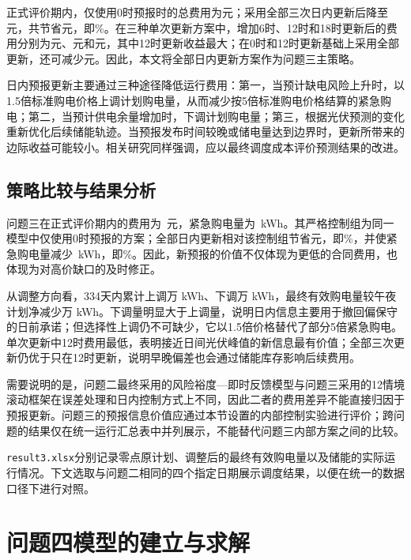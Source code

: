 \documentclass[UTF8,fontset=none,12pt,a4paper]{ctexart}
\newcommand{\sourceinput}[1]{}
\begin{document}
正式评价期内，仅使用0时预报时的总费用为\QThreeIssueZeroCost 元；采用全部三次日内更新后降至\QThreeCost 元，共节省\QThreeUpdateSaving 元，即\QThreeSavingPct\%。在三种单次更新方案中，增加6时、12时和18时更新后的费用分别为\QThreeIssueSixCost 元、\QThreeIssueTwelveCost 元和\QThreeIssueEighteenCost 元，其中12时更新收益最大；在0时和12时更新基础上采用全部更新，还可减少\QThreeAllVsTwelveSaving 元。因此，本文将全部日内更新方案作为问题三主策略。

日内预报更新主要通过三种途径降低运行费用：第一，当预计缺电风险上升时，以1.5倍标准购电价格上调计划购电量，从而减少按5倍标准购电价格结算的紧急购电；第二，当预计供电余量增加时，下调计划购电量；第三，根据光伏预测的变化重新优化后续储能轨迹。当预报发布时间较晚或储电量达到边界时，更新所带来的边际收益可能较小。相关研究同样强调，应以最终调度成本评价预测结果的改进\cite{mazzola}。

\subsection{策略比较与结果分析}
问题三在正式评价期内的费用为\QThreeCost\ 元，紧急购电量为\QThreeEmergencyEnergy\ kWh。其严格控制组为同一模型中仅使用0时预报的方案；全部日内更新相对该控制组节省\QThreeUpdateSaving 元，即\QThreeSavingPct\%，并使紧急购电量减少\QThreeEmergencySaving\ kWh，即\QThreeEmergencySavingPct\%。因此，新预报的价值不仅体现为更低的合同费用，也体现为对高价缺口的及时修正。

从调整方向看，334天内累计上调\QThreeAdjustmentUpWan 万 kWh、下调\QThreeAdjustmentDownWan 万 kWh，最终有效购电量较午夜计划净减少\QThreeAdjustmentNetDownWan 万 kWh。下调量明显大于上调量，说明日内信息主要用于撤回偏保守的日前承诺；但选择性上调仍不可缺少，它以1.5倍价格替代了部分5倍紧急购电。单次更新中12时费用最低，表明接近日间光伏峰值的新信息最有价值；全部三次更新仍优于只在12时更新，说明早晚偏差也会通过储能库存影响后续费用。

需要说明的是，问题二最终采用的风险裕度—即时反馈模型与问题三采用的12情境滚动框架在误差处理和日内控制方式上不同，因此二者的费用差异不能直接归因于预报更新。问题三的预报信息价值应通过本节设置的内部控制实验进行评价；跨问题的结果仅在统一运行汇总表中并列展示，不能替代问题三内部方案之间的比较。

\texttt{result3.xlsx}分别记录零点原计划、调整后的最终有效购电量以及储能的实际运行情况。下文选取与问题二相同的四个指定日期展示调度结果，以便在统一的数据口径下进行对照。
\sourceinput{tables_q3}
\sourceinput{day_interpretations_q3}
\FloatBarrier

\section{问题四模型的建立与求解}
\end{document}
